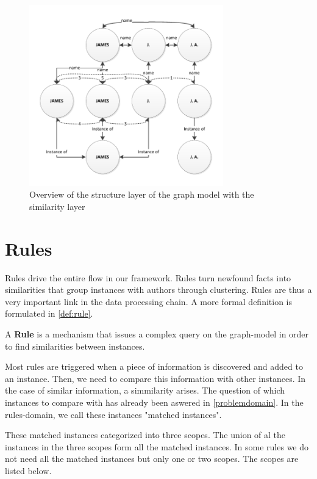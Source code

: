 \begin{figure}[htb]
	\centering
		\includegraphics[width=0.75\textwidth]{fig/graphstructureoverviewsim}
	\caption{Overview of the structure layer of the graph model with the similarity layer}
	\label{fig:graphstructureoverviewsim}
\end{figure}

\section{Rules}
\label{rules}

Rules drive the entire flow in our framework. Rules turn newfound facts into similarities that group instances with authors through clustering. Rules are thus a very important link in the data processing chain. A more formal definition is formulated in \autoref{def:rule}.

\begin{mydef}
\label{def:rule}
A \textbf{Rule} is a mechanism that issues a complex query on the graph-model in order to find similarities between instances.
\end{mydef}

Most rules are triggered when a piece of information is discovered and added to an instance. Then, we need to compare this information with other instances. In the case of similar information, a simmilarity arises. The question of which instances to compare with has already been aswered in \autoref{problemdomain}. In the rules-domain, we call these instances "matched instances".

These matched instances categorized into three scopes. The union of al the instances in the three scopes form all the matched instances. In some rules we do not need all the matched instances but only one or two scopes. The scopes are listed below.

